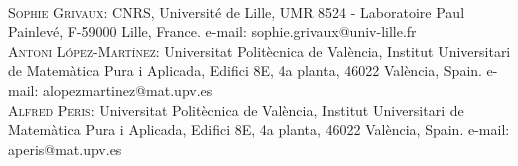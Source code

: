 \documentclass[openright,11pt]{article}
\theoremstyle{plain}
\theoremstyle{definition}
\begin{document}
{\small
$\ $\\

\textsc{Sophie Grivaux}: CNRS, Universit\'e de Lille, UMR 8524 - Laboratoire Paul Painlev\'e, F-59000 Lille, France. e-mail: sophie.grivaux@univ-lille.fr\\

\textsc{Antoni L\'opez-Mart\'inez}: Universitat Polit\`ecnica de Val\`encia, Institut Universitari de Matem\`atica Pura i Aplicada, Edifici 8E, 4a planta, 46022 Val\`encia, Spain. e-mail: alopezmartinez@mat.upv.es\\

\textsc{Alfred Peris}: Universitat Polit\`ecnica de Val\`encia, Institut Universitari de Matem\`atica Pura i Aplicada, Edifici 8E, 4a planta, 46022 Val\`encia, Spain. e-mail: aperis@mat.upv.es
}
\end{document}
